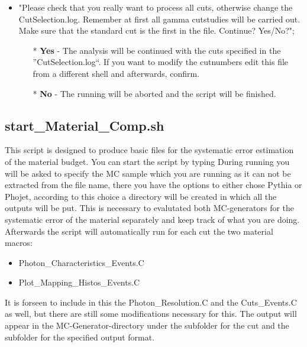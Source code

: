 \begin{itemize}
	\item 	"Please check that you really want to process all cuts, otherwise change the CutSelection.log. Remember at first all gamma cutstudies will be carried out. Make sure that the standard cut is the first in the file. Continue? Yes/No?";
		\begin{itemize}	
		 \item [*] \textbf{Yes} - The analysis will be continued with the cuts specified in the ''CutSelection.log``. If you want to modify the cutnumbers edit this file from a different shell and afterwards, confirm.
		 \item [*] \textbf{No} - The running will be aborted and the script will be finished.
		\end{itemize}
	\end{itemize}

		
		\subsection{start\_Material\_Comp.sh}
			This script is designed to produce basic files for the systematic error estimation of the material budget. You can start the script by typing
			During running you will be asked to specify the MC sample which you are running as it can not be extracted from the file name, there you have the options to either chose Pythia or Phojet, according to this choice a directory will be created in which all the outputs will be put. This is necessary to evalutated both MC-generators for the systematic error of the material separately and keep track of what you are doing. 
			Afterwards the script will automatically run for each cut the two material macros:
			\begin{itemize}
				\item  Photon\_Characteristics\_Events.C
			 	\item  Plot\_Mapping\_Histos\_Events.C 	
			\end{itemize}
			It is forseen to include in this the Photon\_Resolution.C and the Cuts\_Events.C as well, but there are still some modifications necessary for this. The output will appear in the MC-Generator-directory under the subfolder for the cut and the subfolder for the specified output format.  
